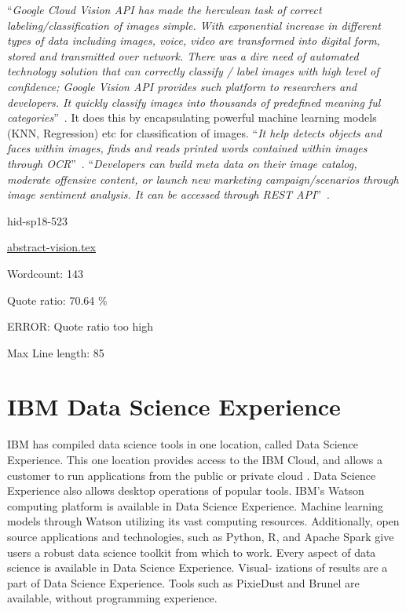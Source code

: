 \color{blue}``\emph{Google Cloud Vision API has made the herculean task of correct 
labeling/classification of images simple. With exponential increase 
in different types of data including images, voice, video are 
transformed into digital form, stored and transmitted over network. 
There was a dire need of automated technology solution that can 
correctly classify / label images with high level of confidence; 
Google Vision API provides such platform to researchers and developers. 
It quickly classify images into thousands of predefined 
meaning ful categories}''\color{black}~\cite{hid-sp18-523-www-google-vision}. 
It does this by encapsulating powerful machine learning 
models (KNN, Regression) etc for classification of images. 
\color{blue}``\emph{It help detects objects and faces within images, finds and reads 
printed words contained within images through 
OCR}''\color{black}~\cite{hid-sp18-523-www-google-vision}. 
\color{blue}``\emph{Developers can build meta data on their image catalog, moderate 
offensive content, or launch new marketing campaign/scenarios through 
image sentiment analysis. It can be accessed 
through REST API}''\color{black}~\cite{hid-sp18-523-www-google-vision}.



\begin{IU}

hid-sp18-523

\href{https://github.com/cloudmesh-community/hid-sp18-523/blob/master//technology/abstract-vision.tex}{abstract-vision.tex}

 

Wordcount: 143


Quote ratio: 70.64 \%

ERROR: Quote ratio too high
 
Max Line length: 85
\end{IU}

\section{IBM Data Science Experience}

IBM has compiled data science tools in one location, 
called Data Science Experience. This one location provides
access to the IBM Cloud, and allows a customer to run 
applications from the public or private cloud 
\cite{hid-sp18-525-dsx}.
Data Science Experience also allows desktop operations 
of popular tools\cite{hid-sp18-525-dsx}.
IBM’s Watson computing platform is available in Data Science
Experience. Machine learning models through Watson utilizing
its vast computing resources. Additionally, open source 
applications and technologies, such as Python, R, and Apache 
Spark give users a robust data science toolkit from which to
work\cite{hid-sp18-525-dsx}.
Every aspect of data science is available in Data Science 
Experience. Visual- izations of results are a part of Data 
Science Experience. Tools such as PixieDust and Brunel are 
available, without programming
experience\cite{hid-sp18-525-dsx}.



